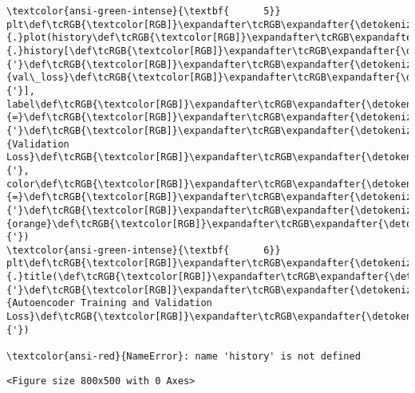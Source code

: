 \documentclass[11pt]{article}
\begin{document}
\begin{Verbatim}[commandchars=\\\{\}, frame=single, framerule=2mm, rulecolor=\color{outerrorbackground}]
\textcolor{ansi-green-intense}{\textbf{      5}} plt\def\tcRGB{\textcolor[RGB]}\expandafter\tcRGB\expandafter{\detokenize{98,98,98}}{.}plot(history\def\tcRGB{\textcolor[RGB]}\expandafter\tcRGB\expandafter{\detokenize{98,98,98}}{.}history[\def\tcRGB{\textcolor[RGB]}\expandafter\tcRGB\expandafter{\detokenize{175,0,0}}{'}\def\tcRGB{\textcolor[RGB]}\expandafter\tcRGB\expandafter{\detokenize{175,0,0}}{val\_loss}\def\tcRGB{\textcolor[RGB]}\expandafter\tcRGB\expandafter{\detokenize{175,0,0}}{'}], label\def\tcRGB{\textcolor[RGB]}\expandafter\tcRGB\expandafter{\detokenize{98,98,98}}{=}\def\tcRGB{\textcolor[RGB]}\expandafter\tcRGB\expandafter{\detokenize{175,0,0}}{'}\def\tcRGB{\textcolor[RGB]}\expandafter\tcRGB\expandafter{\detokenize{175,0,0}}{Validation Loss}\def\tcRGB{\textcolor[RGB]}\expandafter\tcRGB\expandafter{\detokenize{175,0,0}}{'}, color\def\tcRGB{\textcolor[RGB]}\expandafter\tcRGB\expandafter{\detokenize{98,98,98}}{=}\def\tcRGB{\textcolor[RGB]}\expandafter\tcRGB\expandafter{\detokenize{175,0,0}}{'}\def\tcRGB{\textcolor[RGB]}\expandafter\tcRGB\expandafter{\detokenize{175,0,0}}{orange}\def\tcRGB{\textcolor[RGB]}\expandafter\tcRGB\expandafter{\detokenize{175,0,0}}{'})
\textcolor{ansi-green-intense}{\textbf{      6}} plt\def\tcRGB{\textcolor[RGB]}\expandafter\tcRGB\expandafter{\detokenize{98,98,98}}{.}title(\def\tcRGB{\textcolor[RGB]}\expandafter\tcRGB\expandafter{\detokenize{175,0,0}}{'}\def\tcRGB{\textcolor[RGB]}\expandafter\tcRGB\expandafter{\detokenize{175,0,0}}{Autoencoder Training and Validation Loss}\def\tcRGB{\textcolor[RGB]}\expandafter\tcRGB\expandafter{\detokenize{175,0,0}}{'})

\textcolor{ansi-red}{NameError}: name 'history' is not defined
    \end{Verbatim}

    
    \begin{Verbatim}[commandchars=\\\{\}]
<Figure size 800x500 with 0 Axes>
    \end{Verbatim}
\end{document}
